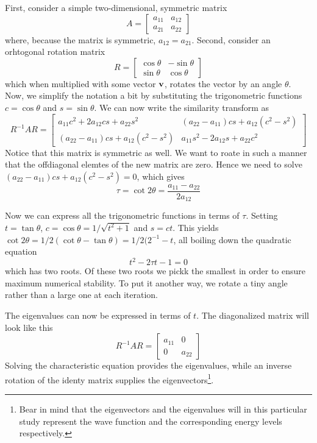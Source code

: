 \documentclass[10pt, a4paper]{amsart}
\begin{document}
First, consider a simple two-dimensional, symmetric matrix
\begin{equation}
A = \begin{bmatrix}
a_{11} & a_{12} \\
a_{21} & a_{22}
\end{bmatrix}
\end{equation}
where, because the matrix is symmetric, $a_{12}=a_{21}$. Second, consider an orhtogonal rotation matrix
\begin{equation}
R = \begin{bmatrix}
\cos{\theta} & -\sin{\theta} \\
\sin{\theta} & \cos{\theta}
\end{bmatrix}
\end{equation}
which when multiplied with some vector $\vb{v}$, rotates the vector by an angle $\theta$. Now, we simplify the notation a bit by substituting the trigonometric functions $c=\cos{\theta}$ and $s=\sin{\theta}$. We can now write the similarity transform as
\begin{equation}
R^{-1}AR=\begin{bmatrix}
a_{11}c^2+2a_{12}cs + a_{22}s^2 & (a_{22}-a_{11})cs+a_{12}(c^2-s^2) \\
(a_{22}-a_{11})cs + a_{12}(c^2-s^2) & a_{11}s^2-2a_{12}s+a_{22}c^2
\end{bmatrix}
\end{equation}
Notice that this matrix is symmetric as well. We want to roate in such a manner that the offdiagonal elemtes of the new matrix are zero. Hence we need to solve $(a_{22}-a_{11})cs + a_{12}(c^2-s^2)=0$, which gives
\begin{equation}
\tau = \cot{2\theta} = \frac{a_{11}-a_{22}}{2a_{12}}
\end{equation}

Now we can express all the trigonometric functions in terms of $\tau$. Setting $t = \tan{\theta}$, $c=\cos{\theta}=1/\sqrt{t^2+1}$ and $s=ct$. This yields $\cot{2\theta}=1/2(\cot{\theta}-\tan{\theta}) = 1/2(2^{-1}-t$, all boiling down the quadratic equation
\begin{equation}
t^2-2\tau t-1 =0
\end{equation}
which has two roots. Of these two roots we pickk the smallest in order to ensure maximum  numerical stability. To put it another way, we rotate a tiny angle rather than a large one at each iteration.

The eigenvalues can now be expressed in terms of $t$. The diagonalized matrix will look like this
\begin{equation}
R^{-1}AR = \begin{bmatrix}
a_{11} & 0 \\
0 & a_{22}
\end{bmatrix}
\end{equation}
Solving the characteristic equation provides the eigenvalues, while an inverse rotation of the identy matrix supplies the eigenvectors\footnote{Bear in mind that the eigenvectors and the eigenvalues will in this particular study represent the wave function and the corresponding energy levels respectively.}.
\end{document}
